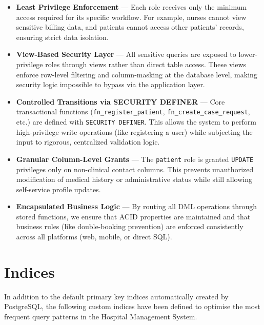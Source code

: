 \documentclass{article}
\begin{document}
\begin{itemize}[leftmargin=1.5cm]
    \item \textbf{Least Privilege Enforcement} --- Each role receives only the minimum access required for its specific workflow. For example, nurses cannot view sensitive billing data, and patients cannot access other patients' records, ensuring strict data isolation.
 
    \item \textbf{View-Based Security Layer} --- All sensitive queries are exposed to lower-privilege roles through views rather than direct table access. These views enforce row-level filtering and column-masking at the database level, making security logic impossible to bypass via the application layer.
 
    \item \textbf{Controlled Transitions via SECURITY DEFINER} --- Core transactional functions (\texttt{fn\_register\_patient}, \texttt{fn\_create\_case\_request}, etc.) are defined with \texttt{SECURITY DEFINER}. This allows the system to perform high-privilege write operations (like registering a user) while subjecting the input to rigorous, centralized validation logic.
 
    \item \textbf{Granular Column-Level Grants} --- The \texttt{patient} role is granted \texttt{UPDATE} privileges only on non-clinical contact columns. This prevents unauthorized modification of medical history or administrative status while still allowing self-service profile updates.
 
    \item \textbf{Encapsulated Business Logic} --- By routing all DML operations through stored functions, we ensure that ACID properties are maintained and that business rules (like double-booking prevention) are enforced consistently across all platforms (web, mobile, or direct SQL).
\end{itemize}
 
\newpage
\section{Indices}

In addition to the default primary key indices automatically created by PostgreSQL, the following custom indices have been defined to optimise the most frequent query patterns in the Hospital Management System.
\end{document}
